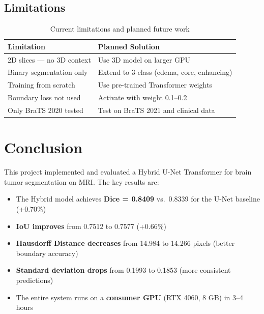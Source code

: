 \documentclass[12pt, a4paper]{article}
\begin{document}
\subsection{Limitations}

\begin{table}[H]
    \centering
    \caption{Current limitations and planned future work}
    \begin{tabular}{ll}
        \toprule
        \textbf{Limitation} & \textbf{Planned Solution} \\
        \midrule
        2D slices — no 3D context & Use 3D model on larger GPU \\
        Binary segmentation only & Extend to 3-class (edema, core, enhancing) \\
        Training from scratch & Use pre-trained Transformer weights \\
        Boundary loss not used & Activate with weight 0.1--0.2 \\
        Only BraTS 2020 tested & Test on BraTS 2021 and clinical data \\
        \bottomrule
    \end{tabular}
\end{table}

\section{Conclusion}

This project implemented and evaluated a Hybrid U-Net Transformer for brain tumor segmentation on MRI. The key results are:

\begin{itemize}
    \item The Hybrid model achieves \textbf{Dice = 0.8409} vs.\ 0.8339 for the U-Net baseline (+0.70\%)
    \item \textbf{IoU improves} from 0.7512 to 0.7577 (+0.66\%)
    \item \textbf{Hausdorff Distance decreases} from 14.984 to 14.266 pixels (better boundary accuracy)
    \item \textbf{Standard deviation drops} from 0.1993 to 0.1853 (more consistent predictions)
    \item The entire system runs on a \textbf{consumer GPU} (RTX 4060, 8 GB) in 3--4 hours
\end{itemize}
\end{document}
